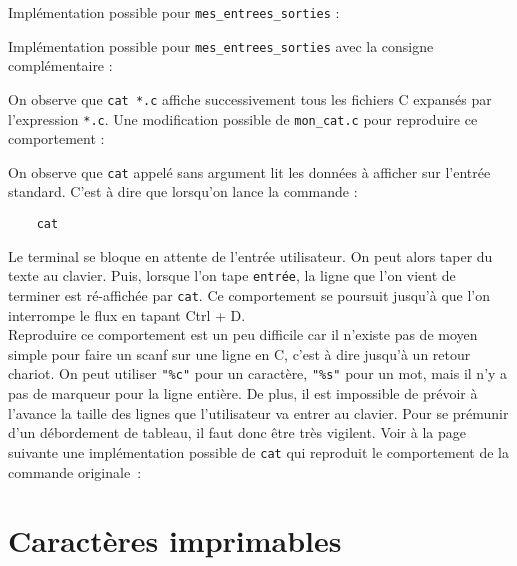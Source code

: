 \documentclass[10pt]{article}
\begin{document}
\begin{enumerate}[label=\textbf{[\alph*]}]
  Implémentation possible pour \texttt{mes\_entrees\_sorties} :

  \vspace{0.5cm}
  

  \newpage
\item Implémentation possible pour \texttt{mes\_entrees\_sorties} avec
  la consigne complémentaire :

  \vspace{0.5cm}
  

  \newpage
\item On observe que \texttt{cat *.c} affiche successivement tous les
  fichiers C expansés par l'expression \texttt{*.c}. Une modification
  possible de \texttt{mon\_cat.c} pour reproduire ce comportement :

  \vspace{0.5cm}
  

\item On observe que \texttt{cat} appelé sans argument lit les données
  à afficher sur l'entrée standard. C'est à dire que lorsqu'on lance
  la commande :

\begin{verbatim}
    cat
\end{verbatim}

  Le terminal se bloque en attente de l'entrée utilisateur. On peut
  alors taper du texte au clavier. Puis, lorsque l'on tape
  \texttt{entrée}, la ligne que l'on vient de terminer est ré-affichée
  par \texttt{cat}. Ce comportement se poursuit jusqu'à que l'on
  interrompe le flux en tapant Ctrl + D. \\

  Reproduire ce comportement est un peu difficile car il n'existe pas
  de moyen simple pour faire un scanf sur une ligne en C, c'est à dire
  jusqu'à un retour chariot. On peut utiliser \texttt{"\%c"} pour un
  caractère, \texttt{"\%s"} pour un mot, mais il n'y a pas de marqueur
  pour la ligne entière. De plus, il est impossible de prévoir à
  l'avance la taille des lignes que l'utilisateur va entrer au
  clavier. Pour se prémunir d'un débordement de tableau, il faut donc
  être très vigilent. Voir à la page suivante une implémentation
  possible de \texttt{cat} qui reproduit le comportement de la
  commande originale~:

  \newpage
  

  \newpage
  \section{Caractères imprimables}


\end{enumerate}
\end{document}
